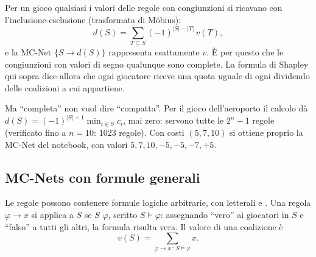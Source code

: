 \begin{extra}
Per un gioco qualsiasi i valori delle regole con congiunzioni si ricavano con
l'inclusione-esclusione (trasformata di Möbius):
\[
  d(S) = \sum_{T \subseteq S} (-1)^{|S| - |T|}\, v(T),
\]
e la MC-Net $\{S \to d(S)\}$ rappresenta esattamente $v$. È per questo che le congiunzioni
con valori di segno qualunque sono complete. La formula di Shapley qui sopra dice allora che
ogni giocatore riceve una quota uguale di ogni dividendo delle coalizioni a cui appartiene.

Ma ``completa'' non vuol dire ``compatta''. Per il gioco dell'aeroporto il calcolo dà
$d(S) = (-1)^{|S|+1} \min_{i\in S} c_i$, mai zero: servono tutte le $2^n - 1$ regole
(verificato fino a $n = 10$: 1023 regole). Con costi $(5,7,10)$ si ottiene proprio la MC-Net
del notebook, con valori $5, 7, 10, -5, -5, -7, +5$.
\end{extra}

\subsection{MC-Nets con formule generali}

Le regole possono contenere formule logiche arbitrarie, con letterali  e
. Una regola $\varphi \to x$ si applica a $S$ se $S$ 
$\varphi$, scritto $S \models \varphi$: assegnando ``vero'' ai giocatori in $S$ e ``falso''
a tutti gli altri, la formula risulta vera. Il valore di una coalizione è
\[
  v(S) = \sum_{\varphi \to x \,:\, S \models \varphi} x.
\]

